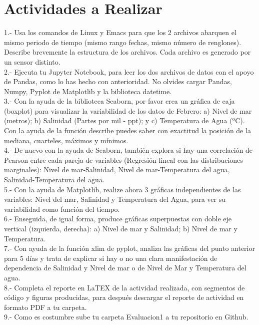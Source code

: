 \documentclass{article}
\begin{document}
\section{Actividades a Realizar}
1.- Usa los comandos de Linux y Emacs para que los 2 archivos abarquen el mismo periodo de tiempo (mismo rango fechas, mismo número de renglones). Describe brevemente la estructura de los archivos. Cada archivo es generado por un sensor distinto. \\
2.- Ejecuta tu Jupyter Notebook, para leer los dos archivos de datos con el apoyo de Pandas, como lo has hecho con anterioridad. No olvides cargar Pandas, Numpy, Pyplot de Matplotlib y la biblioteca datetime.\\
3.- Con la ayuda de la biblioteca Seaborn,  por favor crea un gráfica de caja (boxplot) para visualizar la variabilidad de los datos de Febrero: a) Nivel de mar (metros); b) Salinidad (Partes por mil - ppt); y c) Temperatura de Agua (ºC).  Con la ayuda de la función describe puedes saber con exactitud la posición de la mediana, cuarteles, máximos y mínimos.\\
4.- De nuevo con la ayuda de Seaborn, también explora si hay una correlación de Pearson entre cada pareja de variables (Regresión lineal con las distribuciones marginales): Nivel de mar-Salinidad, Nivel de mar-Temperatura del agua, Salinidad-Temperatura del agua.\\
5.- Con la ayuda de Matplotlib, realize ahora 3 gráficas independientes de las variables: Nivel del mar, Salinidad y Temperatura del Agua, para ver su variabilidad como función del tiempo.\\
6.- Enseguida, de igual forma, produce gráficas superpuestas con doble eje vertical (izquierda, derecha): a) Nivel de mar y Salinidad; b) Nivel de mar y Temperatura.\\
7.- Con ayuda de la función xlim de pyplot, analiza las gráficas del punto anterior para 5 días y trata de explicar si hay o no una clara manifestación de dependencia de Salinidad y Nivel de mar o de Nivel de Mar y Temperatura del agua.\\
8.- Completa el reporte en LaTEX de la actividad realizada, con segmentos de código y figuras producidas, para después descargar el reporte de actividad en formato PDF a tu carpeta.\\
9.- Como es costumbre sube tu carpeta Evaluacion1 a tu repositorio en Github.\\
\end{document}
